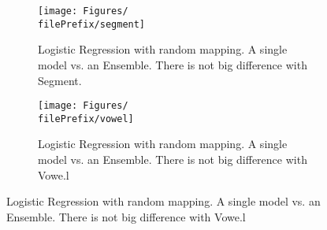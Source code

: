 \begin{figure}[H]
  \centering
  \begin{subfigure}[t]{0.5\linewidth}
    \centering\captionsetup{width=.8\linewidth}\texttt{[image: Figures/\\filePrefix/segment]}
    \caption{Logistic Regression with random mapping. A single model vs. an Ensemble. There is not big difference with Segment.}
    \label{fig:\undPrefix_segment}
  \end{subfigure}%
  \begin{subfigure}[t]{0.5\linewidth}
    \centering\captionsetup{width=.8\linewidth}\texttt{[image: Figures/\\filePrefix/vowel]}
    \caption{Logistic Regression with random mapping. A single model vs. an Ensemble. There is not big difference with Vowe.l}
    \label{fig:\undPrefix_vowel}
  \end{subfigure}
\end{figure}




\let\major\undefined
\let\minor\undefined

\let\undPrefix\undefined
\let\dotPrefix\undefined
\let\scoPrefix\undefined

\let\filePrefix\undefined
